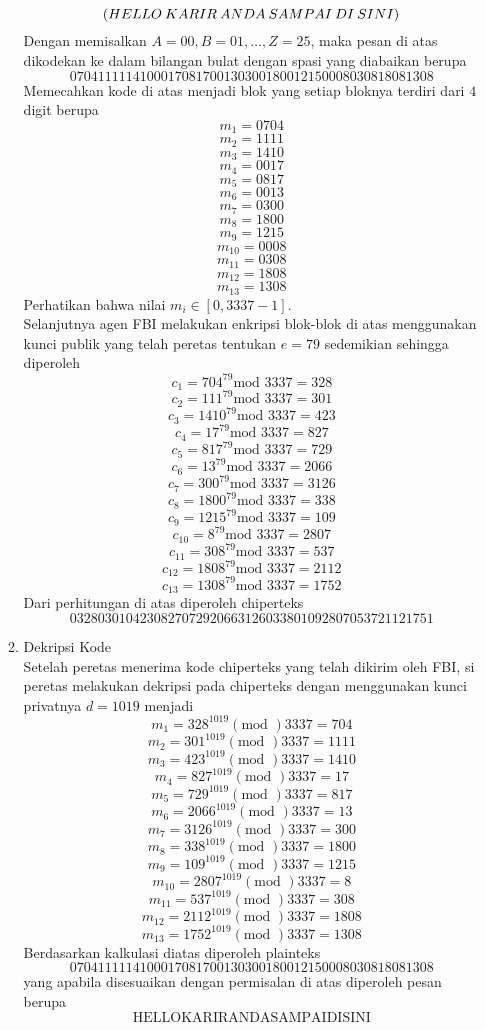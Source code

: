 \documentclass[12pt,A4paper]{article}
\begin{document}
\begin{itemize}
\begin{enumerate}
	\[\text(HELLO \: KARIR \:ANDA \: SAMPAI \:DI \:SINI )\]
	Dengan memisalkan $A= 00, B=01, \dots, Z =25$, maka pesan di atas dikodekan ke dalam bilangan bulat dengan spasi yang diabaikan berupa 
	\[07 04 11 11 14 10 00 17 08 17 00 13 03 00 18 00 12 15 00 08 03 08 18 08 13 08 \]
	Memecahkan kode di atas menjadi blok yang setiap bloknya terdiri dari $4$ digit berupa
	\newpage
	\[m_1 = 0704\]
	\[m_2 = 1111 \]
	\[m_3 = 1410\]
	\[m_4 = 0017\]
	\[m_5 = 0817\]
	\[m_6 = 0013\]
	\[m_7 = 0300\]
	\[m_8 =1800\]
	\[m_9 = 1215\]
	\[m_{10} = 0008\]
	\[m_{11} = 0308\]
	\[m_{12} = 1808\]
	\[m_{13} = 1308\]
	Perhatikan bahwa nilai $m_i \in [0, 3337 -1]$.
	\\ Selanjutnya agen FBI melakukan enkripsi blok-blok di atas menggunakan kunci publik yang telah peretas tentukan $e = 79$ sedemikian sehingga diperoleh 
	\[c_1 = 704^{79} \text{mod } 3337 = 328\]
\[c_2 = 111^{79} \text{mod } 3337 = 301\]
\[c_3 = 1410^{79} \text{mod } 3337 = 423\]
\[c_4 = 17^{79} \text{mod } 3337 = 827\]
\[c_5 = 817^{79} \text{mod } 3337 = 729\]
\[c_6 = 13^{79} \text{mod } 3337 = 2066\]
\[c_7 = 300^{79} \text{mod } 3337 = 3126\]
\[c_8 = 1800^{79} \text{mod } 3337 = 338\]
\[c_9 = 1215^{79} \text{mod } 3337 = 109 \]
\[c_{10} = 8^{79} \text{mod } 3337 = 2807 \]
\[c_{11} = 308^{79} \text{mod } 3337 =537 \]
\[c_{12} = 1808^{79} \text{mod } 3337 =2112 \]
\[c_{13} = 1308^{79} \text{mod } 3337 = 1752\]
Dari perhitungan di atas diperoleh chiperteks 
\[0328 0301 0423 0827 0729 2066 3126 0338 0109 2807 0537 2112 1751\]
\item Dekripsi Kode 
\\ Setelah peretas menerima kode chiperteks yang telah dikirim oleh FBI, si peretas melakukan dekripsi pada chiperteks dengan menggunakan kunci privatnya $d = 1019$ menjadi
\[m_1 = 328^{1019} (\text{mod }) 3337 = 704\]
\[m_2 = 301^{1019} (\text{mod }) 3337 = 1111\]
\[m_3 = 423^{1019} (\text{mod }) 3337 =1410 \]
\[m_4 = 827^{1019} (\text{mod }) 3337 = 17\]
\[m_5 = 729^{1019} (\text{mod }) 3337 = 817\]
\[m_6 = 2066^{1019} (\text{mod }) 3337 = 13\]
\[m_7 = 3126^{1019} (\text{mod }) 3337 = 300\]
\[m_8 = 338^{1019} (\text{mod }) 3337 = 1800\]
\[m_9 = 109^{1019} (\text{mod }) 3337 = 1215\]
\[m_{10} = 2807^{1019} (\text{mod }) 3337 = 8\]
\[m_{11} = 537^{1019} (\text{mod }) 3337 = 308\]
\[m_{12} = 2112^{1019} (\text{mod }) 3337 = 1808\]
\[m_{13} =1752^{1019} (\text{mod }) 3337 = 1308\]
Berdasarkan kalkulasi diatas diperoleh plainteks
\[07 04 11 11 14 10 00 17 08 17 00 13 03 00 18 00 12 15 00 08 03 08 18 08 13 08\]
yang apabila disesuaikan dengan permisalan di atas diperoleh pesan berupa
\[\text{HELLOKARIRANDASAMPAIDISINI}\]
	\end{enumerate}
	\end{itemize}
\end{document}
